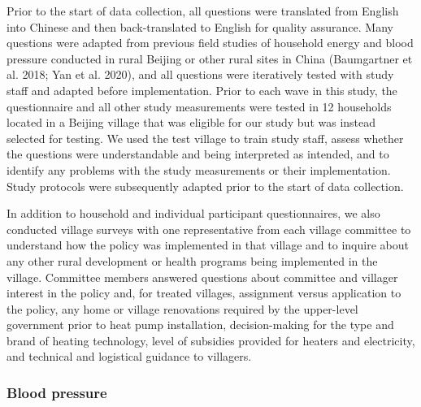 \documentclass[
  letterpaper,
  DIV=11,
  numbers=noendperiod]{scrartcl}
\begin{document}
Prior to the start of data collection, all questions were translated
from English into Chinese and then back-translated to English for
quality assurance. Many questions were adapted from previous field
studies of household energy and blood pressure conducted in rural
Beijing or other rural sites in China (Baumgartner et al. 2018; Yan et
al. 2020), and all questions were iteratively tested with study staff
and adapted before implementation. Prior to each wave in this study, the
questionnaire and all other study measurements were tested in 12
households located in a Beijing village that was eligible for our study
but was instead selected for testing. We used the test village to train
study staff, assess whether the questions were understandable and being
interpreted as intended, and to identify any problems with the study
measurements or their implementation. Study protocols were subsequently
adapted prior to the start of data collection.

In addition to household and individual participant questionnaires, we
also conducted village surveys with one representative from each village
committee to understand how the policy was implemented in that village
and to inquire about any other rural development or health programs
being implemented in the village. Committee members answered questions
about committee and villager interest in the policy and, for treated
villages, assignment versus application to the policy, any home or
village renovations required by the upper-level government prior to heat
pump installation, decision-making for the type and brand of heating
technology, level of subsidies provided for heaters and electricity, and
technical and logistical guidance to villagers.

\subsubsection{Blood pressure}\label{blood-pressure}
\end{document}
